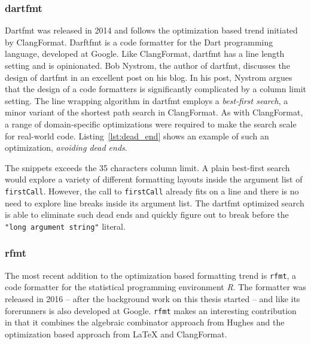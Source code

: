 \subsubsection{dartfmt}
Dartfmt\autocite{nystrom_dart_style_2014} was released in 2014 and follows the optimization based trend initiated by ClangFormat.
Darftfmt is a code formatter for the Dart programming language, developed at Google.
Like ClangFormat, dartfmt has a line length setting and is opinionated.
Bob Nystrom, the author of dartfmt, discusses the design of dartfmt in an excellent post\autocite{nystrom_hardest_2015} on his blog.
In his post, Nystrom argues that the design of a code formatters is significantly complicated by a column limit setting.
The line wrapping algorithm in dartfmt employs a \emph{best-first search}\autocite{pearl_heuristics:_1984},
a minor variant of the shortest path search in ClangFormat.
As with ClangFormat, a range of domain-specific optimizations were required to make the search scale for real-world code.
Listing~\ref{lst:dead_end} shows an example of such an optimization, \emph{avoiding dead ends}.

The snippets exceeds the 35 characters column limit.
A plain best-first search would explore a variety of different formatting layouts inside the argument list of \texttt{firstCall}.
However, the call to \texttt{firstCall} already fits on a line and there is no need to explore line breaks inside its argument list.
The dartfmt optimized search is able to eliminate such dead ends and quickly figure out to break before the \texttt{"long argument string"} literal.

\subsubsection{rfmt}
\newcommand{\naive}{na\"{\i}ve}
\newcommand{\rfmt}{\texttt{rfmt}}
The most recent addition to the optimization based formatting trend is \rfmt\autocite{yelland_new_2016},
a code formatter for the statistical programming environment \emph{R}.
The formatter was released in 2016 -- after the background work on this thesis started -- and like its forerunners is also developed at Google.
\rfmt{} makes an interesting contribution in that it combines the algebraic combinator approach from Hughes\autocite{hughes_design_1995} and the optimization based approach from \LaTeX{} and ClangFormat.

